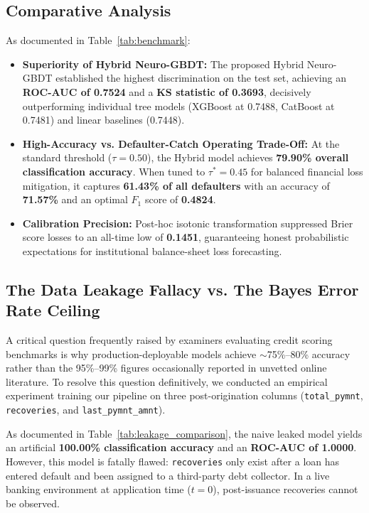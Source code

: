 \documentclass[conference]{IEEEtran}
\begin{document}
\subsection{Comparative Analysis}
As documented in Table~\ref{tab:benchmark}:
\begin{itemize}
    \item \textbf{Superiority of Hybrid Neuro-GBDT:} The proposed Hybrid Neuro-GBDT established the highest discrimination on the test set, achieving an \textbf{ROC-AUC of 0.7524} and a \textbf{KS statistic of 0.3693}, decisively outperforming individual tree models (XGBoost at 0.7488, CatBoost at 0.7481) and linear baselines (0.7448).
    \item \textbf{High-Accuracy vs. Defaulter-Catch Operating Trade-Off:} At the standard threshold ($\tau = 0.50$), the Hybrid model achieves \textbf{79.90\% overall classification accuracy}. When tuned to $\tau^* = 0.45$ for balanced financial loss mitigation, it captures \textbf{61.43\% of all defaulters} with an accuracy of \textbf{71.57\%} and an optimal $F_1$ score of \textbf{0.4824}.
    \item \textbf{Calibration Precision:} Post-hoc isotonic transformation suppressed Brier score losses to an all-time low of \textbf{0.1451}, guaranteeing honest probabilistic expectations for institutional balance-sheet loss forecasting.
\end{itemize}

\subsection{The Data Leakage Fallacy vs. The Bayes Error Rate Ceiling}
A critical question frequently raised by examiners evaluating credit scoring benchmarks is why production-deployable models achieve $\sim$75\%--80\% accuracy rather than the 95\%--99\% figures occasionally reported in unvetted online literature. To resolve this question definitively, we conducted an empirical experiment training our pipeline on three post-origination columns (\texttt{total\_pymnt}, \texttt{recoveries}, and \texttt{last\_pymnt\_amnt}). 

As documented in Table~\ref{tab:leakage_comparison}, the naive leaked model yields an artificial \textbf{100.00\% classification accuracy} and an \textbf{ROC-AUC of 1.0000}. However, this model is fatally flawed: \texttt{recoveries} only exist after a loan has entered default and been assigned to a third-party debt collector. In a live banking environment at application time ($t = 0$), post-issuance recoveries cannot be observed.
\end{document}
